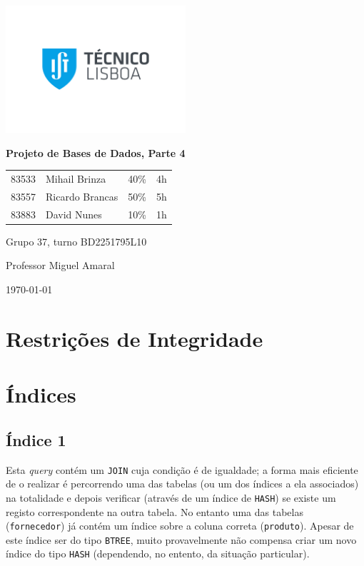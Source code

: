\documentclass[a4paper]{article}
\begin{document}
    \begin{titlepage}
        \centering
        \includegraphics[width=0.5\textwidth]{IST_A_CMYK_POS.pdf}\par
        {\huge\bfseries Projeto de Bases de Dados, Parte 4\par}
        \vspace{2cm}
        {
        \Large
        \begin{tabular}{llll}
            83533 & Mihail Brinza & 40\% & 4h \\
            83557 & Ricardo Brancas & 50\% & 5h \\
            83883 & David Nunes & 10\% & 1h
        \end{tabular}
        }
        \vfill
        \large
        Grupo 37, turno BD2251795L10 \par
        Professor Miguel Amaral

        \vspace{3cm}

        {\normalsize \today\par}
    \end{titlepage}

    \section{Restrições de Integridade}
    

    \section{Índices}

    \subsection{Índice 1}\label{subsec:ind1}
    Esta \textit{query} contém um \lstinline{JOIN} cuja condição é de igualdade; a forma mais eficiente de o
    realizar é percorrendo uma das tabelas (ou um dos índices a ela associados) na totalidade e depois verificar
    (através de um índice de \lstinline{HASH}) se existe um registo correspondente na outra tabela.
    No entanto uma das tabelas (\lstinline{fornecedor}) já contém um índice sobre a coluna correta
    (\lstinline{produto}). Apesar de este índice ser do tipo \lstinline{BTREE}, muito provavelmente
    não compensa criar um novo índice do tipo \lstinline{HASH} (dependendo, no entento, da situação particular).
\end{document}
